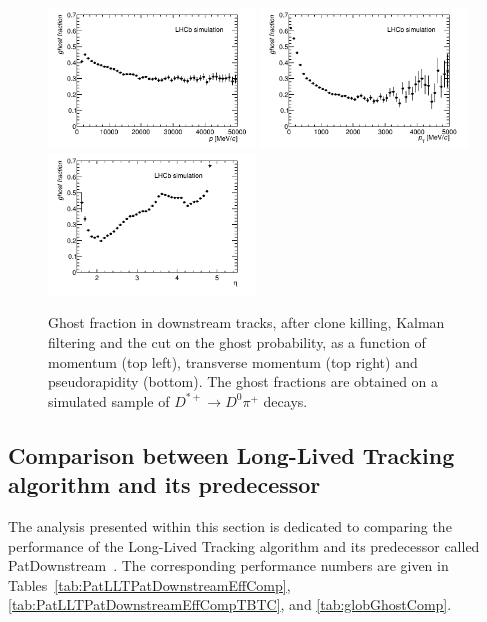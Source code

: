 \begin{figure}[tbph]
\begin{center}
\includegraphics[width =0.49\textwidth]{figures/EffPatLLT/overall/DstD0piGhostFracP_TBTC.png} 
\includegraphics[width =0.49\textwidth]{figures/EffPatLLT/overall/DstD0piGhostFracPt_TBTC.png}
\includegraphics[width =0.49\textwidth]{figures/EffPatLLT/overall/DstD0piGhostFracEta_TBTC.png} 
\caption{Ghost fraction in downstream tracks, after clone killing, Kalman filtering and the cut on the ghost probability, as a function of momentum (top left), transverse momentum (top right) and pseudorapidity (bottom). The ghost fractions are obtained on a simulated sample of $D^{*+} \rightarrow D^{0}\pi^+$ decays.}
\label{fig:ghostsPatLLTDstD0pi_TBTC}
 \end{center}
 \end{figure}


\subsection{Comparison between Long-Lived Tracking algorithm and its predecessor}
The analysis presented within this section is dedicated to comparing the performance of the Long-Lived Tracking algorithm and its predecessor called PatDownstream~\cite{PatDownstream}. The corresponding performance numbers are given in Tables~\ref{tab:PatLLTPatDownstreamEffComp}, \ref{tab:PatLLTPatDownstreamEffCompTBTC}, and \ref{tab:globGhostComp}. 

